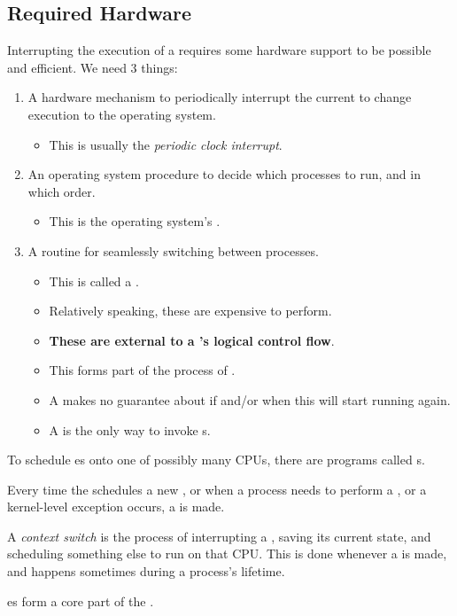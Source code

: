 \subsection{Required Hardware}\label{subsec:Required_Hardware}
Interrupting the execution of a  requires some hardware support to be possible and efficient.
We need 3 things:
\begin{enumerate}[noitemsep]
\item A hardware mechanism to periodically interrupt the current  to change execution to the operating system.
  \begin{itemize}[noitemsep]
  \item This is usually the \emph{periodic clock interrupt}.
  \end{itemize}
\item An operating system procedure to decide which processes to run, and in which order.
  \begin{itemize}[noitemsep]
  \item This is the operating system's .
  \end{itemize}
\item A routine for seamlessly switching between processes.
  \begin{itemize}[noitemsep]
  \item This is called a .
  \item Relatively speaking, these are expensive to perform.
  \item \textbf{These are external to a 's logical control flow}.
  \item This forms part of the process of .
  \item A  makes no guarantee about if and/or when this  will start running again.
  \item A  is the only way to invoke s.
  \end{itemize}
\end{enumerate}

To schedule es onto one of possibly many CPUs, there are programs called s.

Every time the  schedules a new , or when a process needs to perform a , or a kernel-level exception occurs, a  is made.
\begin{definition}\label{def:Context_Switch}
  A \emph{context switch} is the process of interrupting a , saving its current state, and scheduling something else to run on that CPU.\@
  This is done whenever a  is made, and happens sometimes during a process's lifetime.
\end{definition}

es form a core part of the .


